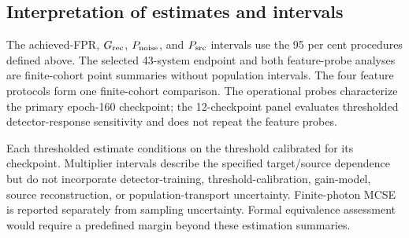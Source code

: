 \subsection{Interpretation of estimates and intervals}
\label{sec:reporting_methods}

The achieved-FPR, \(G_{\rm rec}\), \(P_{\rm noise}\), and \(P_{\rm src}\)
intervals use the 95 per cent procedures defined above. The selected
43-system endpoint and both feature-probe analyses are finite-cohort point
summaries without population intervals. The four feature protocols form one
finite-cohort comparison. The operational probes characterize the primary epoch-160
checkpoint; the 12-checkpoint panel evaluates thresholded detector-response
sensitivity and does not repeat the feature probes.

Each thresholded estimate conditions on the threshold calibrated
for its checkpoint.
Multiplier intervals describe the specified target/source dependence but do
not incorporate detector-training, threshold-calibration, gain-model, source
reconstruction, or population-transport uncertainty. Finite-photon MCSE is
reported separately from sampling uncertainty. Formal equivalence assessment
would require a predefined margin beyond these estimation summaries.
